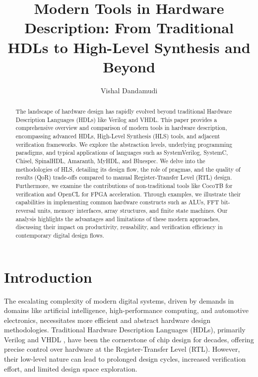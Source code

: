 \documentclass[sigconf, anonymous=false]{acmart} %
\begin{document}
\title{Modern Tools in Hardware Description: From Traditional HDLs to High-Level Synthesis and Beyond}

\author{Vishal Dandamudi}


\begin{abstract}
The landscape of hardware design has rapidly evolved beyond traditional Hardware Description Languages (HDLs) like Verilog and VHDL. This paper provides a comprehensive overview and comparison of modern tools in hardware description, encompassing advanced HDLs, High-Level Synthesis (HLS) tools, and adjacent verification frameworks. We explore the abstraction levels, underlying programming paradigms, and typical applications of languages such as SystemVerilog, SystemC, Chisel, SpinalHDL, Amaranth, MyHDL, and Bluespec. We delve into the methodologies of HLS, detailing its design flow, the role of pragmas, and the quality of results (QoR) trade-offs compared to manual Register-Transfer Level (RTL) design. Furthermore, we examine the contributions of non-traditional tools like CocoTB for verification and OpenCL for FPGA acceleration. Through examples, we illustrate their capabilities in implementing common hardware constructs such as ALUs, FFT bit-reversal units, memory interfaces, array structures, and finite state machines. Our analysis highlights the advantages and limitations of these modern approaches, discussing their impact on productivity, reusability, and verification efficiency in contemporary digital design flows.
\end{abstract}

\maketitle

\section{Introduction}
\label{sec:introduction}
The escalating complexity of modern digital systems, driven by demands in domains like artificial intelligence, high-performance computing, and automotive electronics, necessitates more efficient and abstract hardware design methodologies. Traditional Hardware Description Languages (HDLs), primarily Verilog \cite{IEEE1364} and VHDL \cite{IEEE1076}, have been the cornerstone of chip design for decades, offering precise control over hardware at the Register-Transfer Level (RTL). However, their low-level nature can lead to prolonged design cycles, increased verification effort, and limited design space exploration.
\end{document}
